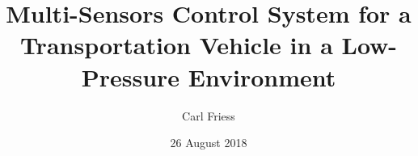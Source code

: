 \documentclass[%
 oneside,      %
 openany,      %
 halfparskip,  %
]{scrbook}
\title{Multi-Sensors Control System for a Transportation Vehicle in a Low-Pressure Environment}
\author{Carl Friess}
\date{26 August 2018}
\begin{document}
\dominitoc

\frontmatter







\tableofcontents
\listoffigures
\listoftables



\mainmatter







\appendix



\backmatter



\nocite*{} %


\end{document}
